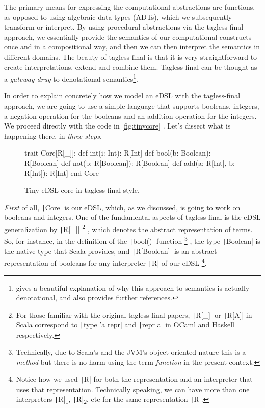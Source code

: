 \documentclass[11pt]{article}
\renewcommand{\vref}[1]{\autoref{#1} \vpageref{#1}}{}
\newcommand{\Scala}[1]{\texttt|#1|}
\newcommand{\ScalaI}[1]{\texttt|#1|}
\newcommand{\TextI}[1]{\texttt|#1|}
\newcommand{\OneTwoThreeX}[1]{\marginpar{\faCubes{ \smaller #1}}\xspace}
\newcommand{\OneTwoThree}{\OneTwoThreeX{}}
\newcommand{\FirstEtcX}[1]{\marginpar{\faCube{ \smaller #1}}\xspace}
\newcommand{\FirstEtc}{\FirstEtcX{}}
\begin{document}
The primary means for expressing the computational abstractions are functions, as opposed to using algebraic data types (ADTs), which we subsequently transform or interpret. By using procedural abstractions via the tagless-final approach, we essentially provide the semantics of our computational constructs once and in a compositional way, and then we can then interpret the semantics in different domains. The beauty of tagless final is that it is very straightforward to create interpretations, extend and combine them. Tagless-final can be thought as a \textit{gateway drug} to denotational semantics\cite{wiki:denotational-semantics}\cite{eff:OCaml:2018}\footnote{%
\cite[Section~3.1.4]{eff:OCaml:2018} gives a beautiful explanation of why this approach to semantics is actually denotational, and also provides further references.}.

In order to explain concretely how we model an eDSL with the tagless-final approach, we are going to use a simple language that supports booleans, integers, a negation operation for the booleans and an addition operation for the integers. We proceed directly with the code in \vref{fig:tinycore}. Let's dissect what is happening there, in \textit{three steps}\OneTwoThree.

\begin{figure}[t]
\begin{ScalaBlock}
trait Core[R[_]]:
  def int(i: Int): R[Int]
  def bool(b: Boolean): R[Boolean]
  def not(b: R[Boolean]): R[Boolean]
  def add(a: R[Int], b: R[Int]): R[Int]
end Core
\end{ScalaBlock}
\caption{Tiny eDSL core in tagless-final style.}
\label{fig:tinycore}
\hrulefill
\end{figure}

\textit{First}\FirstEtc of all, \Scala{Core} is our eDSL, which, as we discussed, is going to work on booleans and integers. One of the fundamental aspects of tagless-final is the eDSL generalization by \Scala{R[_]}%
\footnote{For those familiar with the original tagless-final papers, \ScalaI{R[_]} or \ScalaI{R[A]} in Scala correspond to \TextI{type 'a repr} and \TextI{repr a} in OCaml and Haskell respectively.}%
, which denotes the abstract representation of terms. So, for instance, in the definition of the \Scala{bool()} function%
\footnote{Technically, due to Scala's and the JVM's object-oriented nature this is a \textit{method} but there is no harm using the term \textit{function} in the present context.}
, the type \Scala{Boolean} is the native type that Scala provides, and \Scala{R[Boolean]} is an abstract representation of booleans for any interpreter \ScalaI{R} of our eDSL%
\footnote{Notice how we used \ScalaI{R} for both the representation and an interpreter that uses that representation. Technically speaking, we can have more than one interpreters \ScalaI{R}\textsubscript{1}, \ScalaI{R}\textsubscript{2}, etc for the same representation \ScalaI{R}.}.
\end{document}
